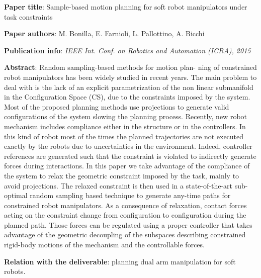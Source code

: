 
\item
\begin{list}{\quad}{}
\item \textbf{Paper title}: Sample-based motion planning for soft robot manipulators under task constraints
\item \textbf{Paper authors}: M. Bonilla, E. Farnioli, L. Pallottino, A. Bicchi
\item\textbf{Publication info}: \textit{IEEE Int. Conf. on Robotics and Automation (ICRA), 2015}
\item\textbf{Abstract}:
Random sampling-based methods for motion plan-
ning of constrained robot manipulators has been widely studied
in recent years. The main problem to deal with is the lack of an
explicit parametrization of the non linear submanifold in the
Configuration Space (CS), due to the constraints imposed by the
system. Most of the proposed planning methods use projections
to generate valid configurations of the system slowing the
planning process.
Recently, new robot mechanism includes compliance either
in the structure or in the controllers. In this kind of robot most
of the times the planned trajectories are not executed exactly
by the robots due to uncertainties in the environment. Indeed,
controller references are generated such that the constraint is
violated to indirectly generate forces during interactions.
In this paper we take advantage of the compliance of
the system to relax the geometric constraint imposed by the
task, mainly to avoid projections. The relaxed constraint is
then used in a state-of-the-art sub-optimal random sampling
based technique to generate any-time paths for constrained
robot manipulators. As a consequence of relaxation, contact
forces acting on the constraint change from configuration to
configuration during the planned path. Those forces can be
regulated using a proper controller that takes advantage of the
geometric decoupling of the subspaces describing constrained
rigid-body motions of the mechanism and the controllable
forces.
\item \textbf{Relation with the deliverable}: planning dual arm manipulation for soft robots.
\end{list}